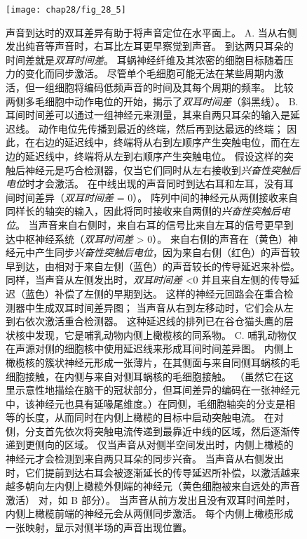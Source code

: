 \begin{figure}[htbp]
	\centering
	\texttt{[image: chap28/fig\_28\_5]}
	\caption{声音到达时的双耳差异有助于将声音定位在水平面上。
		A. 当从右侧发出纯音等声音时，右耳比左耳更早察觉到声音。 
		到达两只耳朵的时间差就是\textit{双耳时间差}。 
		耳蜗神经纤维及其浓密的细胞目标随着压力的变化而同步激活。
		尽管单个毛细胞可能无法在某些周期内激活，但一组细胞将编码低频声音的时间及其每个周期的频率。 
		比较两侧多毛细胞中动作电位的开始，揭示了\textit{双耳时间差}（斜黑线）。 
		B. 耳间时间差可以通过一组神经元来测量，其来自两只耳朵的输入是延迟线\cite{jeffress1948place}。
		动作电位先传播到最近的终端，然后再到达最远的终端；
		因此，在右边的延迟线中，终端将从右到左顺序产生突触电位，而在左边的延迟线中，终端将从左到右顺序产生突触电位。
		假设这样的突触后神经元是巧合检测器，仅当它们同时从左右接收到\textit{兴奋性突触后电位}时才会激活。
		在中线出现的声音同时到达右耳和左耳，没有耳间时间差异（\textit{双耳时间差} = 0）。
		阵列中间的神经元从两侧接收来自同样长的轴突的输入，因此将同时接收来自两侧的\textit{兴奋性突触后电位}。
		当声音来自右侧时，来自右耳的信号比来自左耳的信号更早到达中枢神经系统（\textit{双耳时间差} > 0）。
		来自右侧的声音在（黄色）神经元中产生同步\textit{兴奋性突触后电位}，因为来自右侧（红色）的声音较早到达，由相对于来自左侧（蓝色）的声音较长的传导延迟来补偿。
		同样，当声音从左侧发出时，\textit{双耳时间差} <0 并且来自左侧的传导延迟（蓝色）补偿了左侧的早期到达。
		这样的神经元回路会在重合检测器中生成双耳时间差异图；
		当声音从右到左移动时，它们会从左到右依次激活重合检测器。
		这种延迟线的排列已在谷仓猫头鹰的层状核中发现，它是哺乳动物内侧上橄榄核的同系物。
		C. 哺乳动物仅在声源对侧的细胞核中使用延迟线来形成耳间时间差异图。
		内侧上橄榄核的簇状神经元形成一张薄片，在其侧面与来自同侧耳蜗核的毛细胞接触，在内侧与来自对侧耳蜗核的毛细胞接触。 
		（虽然它在这里示意性地描绘在脑干的冠状部分，但耳间差异的编码在一张神经元中，该神经元也具有延喙尾维度。）在同侧，毛细胞轴突的分支是相等的长度，从而同时在内侧上橄榄的目标中启动突触电流。
		在对侧，分支首先依次将突触电流传递到最靠近中线的区域，然后逐渐传递到更侧向的区域。
		仅当声音从对侧半空间发出时，内侧上橄榄的神经元才会检测到来自两只耳朵的同步兴奋。
		当声音从右侧发出时，它们提前到达右耳会被逐渐延长的传导延迟所补偿，以激活越来越多朝向左内侧上橄榄外侧端的神经元（黄色细胞被来自远处的声音激活） 对，如 B 部分）。
		当声音从前方发出且没有双耳时间差时，内侧上橄榄前端的神经元会从两侧同步激活。
		每个内侧上橄榄形成一张映射，显示对侧半场的声音出现位置\cite{yin2002neural}。}
	\label{fig:28_5}
\end{figure}


